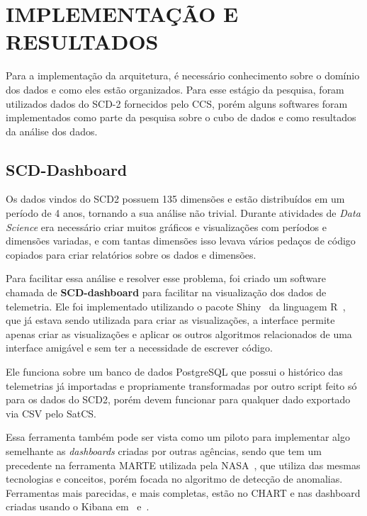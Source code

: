 
\chapter{IMPLEMENTAÇÃO E RESULTADOS}
\label{ch:impl}

Para a implementação da arquitetura, é necessário conhecimento sobre o domínio dos dados e como eles estão organizados.
Para esse estágio da pesquisa, foram utilizados dados do SCD-2 fornecidos pelo CCS, porém alguns softwares foram implementados como parte da pesquisa sobre o cubo de dados e como resultados da análise dos dados.

\section{SCD-Dashboard}
\label{ch:impl:dash}

Os dados vindos do SCD2 possuem 135 dimensões e estão distribuídos em um período de 4 anos, tornando a sua análise não trivial.
Durante atividades de \textit{Data Science} era necessário criar muitos gráficos e visualizações com períodos e dimensões variadas, e com tantas dimensões isso levava vários pedaços de código copiados para criar relatórios sobre os dados e dimensões.

Para facilitar essa análise e resolver esse problema, foi criado um software chamada de \textbf{SCD-dashboard} para facilitar na visualização dos dados de telemetria.
Ele foi implementado utilizando o pacote Shiny~\cite{} da linguagem R~\cite{rcoreteamLanguageEnvironmentStatistical2018}, que já estava sendo utilizada para criar as visualizações, a interface permite apenas criar as visualizações e aplicar os outros algoritmos relacionados de uma interface amigável e sem ter a necessidade de escrever código.

Ele funciona sobre um banco de dados PostgreSQL que possui o histórico das telemetrias já importadas e propriamente transformadas por outro script feito só para os dados do SCD2, porém devem funcionar para qualquer dado exportado via CSV pelo SatCS.

Essa ferramenta também pode ser vista como um piloto para implementar algo semelhante as \textit{dashboards} criadas por outras agências, sendo que tem um precedente na ferramenta MARTE utilizada pela NASA~\cite{fernandezTelemetryAnomalyDetection2017}, que utiliza das mesmas tecnologias e conceitos, porém focada no algoritmo de detecção de anomalias.
Ferramentas mais parecidas, e mais completas, estão no CHART e nas dashboard criadas usando o Kibana em~\cite{mateikUsingBigData2017} e~\cite{zhangBigDataFramework2017}.

